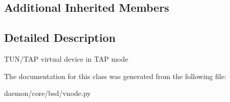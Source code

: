 \subsection*{Additional Inherited Members}


\subsection{Detailed Description}
\begin{DoxyVerb}TUN/TAP virtual device in TAP mode\end{DoxyVerb}
 

The documentation for this class was generated from the following file\+:\begin{DoxyCompactItemize}
\item 
daemon/core/bsd/vnode.\+py\end{DoxyCompactItemize}
